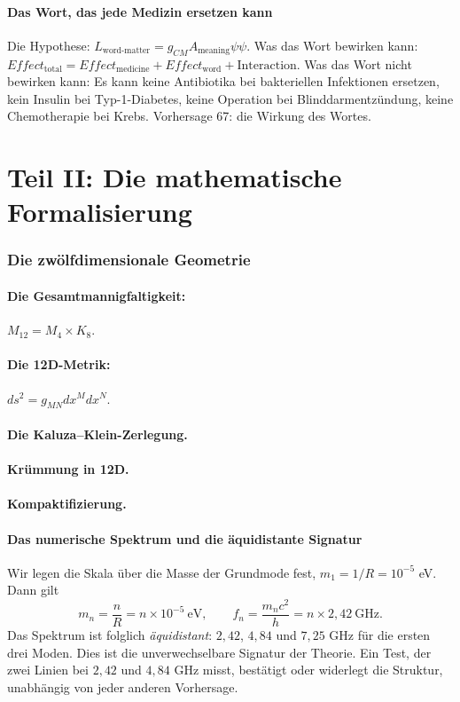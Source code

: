 \documentclass[11pt,a4paper]{article}
\begin{document}
\subsection{Das Wort, das jede Medizin ersetzen kann}
Die Hypothese: $L_{\text{word-matter}} = g_{CM} A_{\text{meaning}} \psi \psi$. Was das Wort bewirken kann: $Effect_{\text{total}} = Effect_{\text{medicine}} + Effect_{\text{word}} + \text{Interaction}$. Was das Wort nicht bewirken kann: Es kann keine Antibiotika bei bakteriellen Infektionen ersetzen, kein Insulin bei Typ-1-Diabetes, keine Operation bei Blinddarmentzündung, keine Chemotherapie bei Krebs. Vorhersage 67: die Wirkung des Wortes.

\newpage
\part*{Teil II: Die mathematische Formalisierung}

\section{Die zwölfdimensionale Geometrie}
\subsection{Die Gesamtmannigfaltigkeit:} $M_{12} = M_4 \times K_8$.
\subsection{Die 12D-Metrik:} $ds^2 = g_{MN} dx^M dx^N$.
\subsection{Die Kaluza--Klein-Zerlegung.}
\subsection{Krümmung in 12D.}
\subsection{Kompaktifizierung.}

\subsection{Das numerische Spektrum und die äquidistante Signatur}
Wir legen die Skala über die Masse der Grundmode fest, $m_1 = 1/R = 10^{-5}$ eV. Dann gilt
\begin{equation}
m_n = \frac{n}{R} = n \times 10^{-5}\ \text{eV},
\qquad
f_n = \frac{m_n c^2}{h} = n \times 2,42\ \text{GHz}.
\end{equation}
Das Spektrum ist folglich \emph{äquidistant}: $2,42$, $4,84$ und $7,25$ GHz für die ersten drei Moden. Dies ist die unverwechselbare Signatur der Theorie. Ein Test, der zwei Linien bei $2,42$ und $4,84$ GHz misst, bestätigt oder widerlegt die Struktur, unabhängig von jeder anderen Vorhersage.
\end{document}
